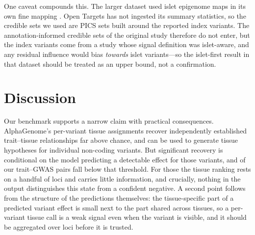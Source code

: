 \documentclass[11pt]{article}
\begin{document}
One caveat compounds this. The larger dataset used islet epigenome maps in its own fine
mapping \citep{mahajan2018finemap}. Open Targets has not ingested its summary statistics,
so the credible sets we used are PICS sets built around the reported index variants. The
annotation-informed credible sets of the original study therefore do not enter, but the
index variants come from a study whose signal definition was islet-aware, and any residual
influence would bias \emph{towards} islet variants---so the islet-first result in that
dataset should be treated as an upper bound, not a confirmation.

\section{Discussion}

Our benchmark supports a narrow claim with practical consequences. AlphaGenome's
per-variant tissue assignments recover independently established trait--tissue
relationships far above chance, and can be used to generate tissue hypotheses for
individual non-coding variants. But significant recovery is conditional on the model predicting a detectable effect for
those variants, and \NNOTSIG{} of our \NTRAITS{} trait--GWAS pairs fall below that
threshold. For those the tissue ranking rests on a handful of loci and carries little
information, and crucially, nothing in the output distinguishes this state from a
confident negative. A second point follows from the structure of the predictions
themselves: the tissue-specific part of a predicted variant effect is small next to the
part shared across tissues, so a per-variant tissue call is a weak signal even when the
variant is visible, and it should be aggregated over loci before it is trusted.
\end{document}
